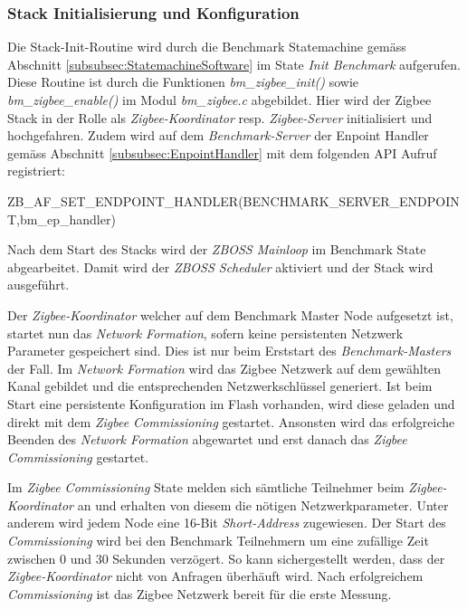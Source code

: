 \subsubsection{Stack Initialisierung und Konfiguration}\label{subsubsec:ZigbeeStackInitundKonfiguration}
Die Stack-Init-Routine wird durch die Benchmark Statemachine gemäss Abschnitt \ref{subsubsec:StatemachineSoftware} im State \textit{Init Benchmark} aufgerufen.
Diese Routine ist durch die Funktionen \textit{bm\_zigbee\_init()} sowie \textit{bm\_zigbee\_enable()} im Modul \textit{bm\_zigbee.c} abgebildet.
Hier wird der Zigbee Stack in der Rolle als \textit{Zigbee-Koordinator} resp. \textit{Zigbee-Server} initialisiert und hochgefahren.
Zudem wird auf dem \textit{Benchmark-Server} der Enpoint Handler gemäss Abschnitt \ref{subsubsec:EnpointHandler} mit dem folgenden API Aufruf registriert:

ZB\_AF\_SET\_ENDPOINT\_HANDLER(BENCHMARK\_SERVER\_ENDPOINT,\linebreak bm\_ep\_handler)

Nach dem Start des Stacks wird der \textit{ZBOSS Mainloop} im Benchmark State abgearbeitet. Damit wird der \textit{ZBOSS Scheduler} aktiviert und der Stack wird ausgeführt.

Der \textit{Zigbee-Koordinator} welcher auf dem Benchmark Master Node aufgesetzt ist, startet nun das \textit{Network Formation}, sofern keine persistenten Netzwerk Parameter gespeichert sind.
Dies ist nur beim Erststart des \textit{Benchmark-Masters} der Fall.
Im \textit{Network Formation} wird das Zigbee Netzwerk auf dem gewählten Kanal gebildet und die entsprechenden Netzwerkschlüssel generiert.
Ist beim Start eine persistente Konfiguration im Flash vorhanden, wird diese geladen und direkt mit dem \textit{Zigbee Commissioning} gestartet.
Ansonsten wird das erfolgreiche Beenden des \textit{Network Formation} abgewartet und erst danach das \textit{Zigbee Commissioning} gestartet.

Im \textit{Zigbee Commissioning} State melden sich sämtliche Teilnehmer beim \textit{Zigbee-Koordinator} an und erhalten von diesem die nötigen Netzwerkparameter.
Unter anderem wird jedem Node eine 16-Bit \textit{Short-Address} zugewiesen.
Der Start des \textit{Commissioning} wird bei den Benchmark Teilnehmern um eine zufällige Zeit zwischen 0 und 30 Sekunden verzögert.
So kann sichergestellt werden, dass der \textit{Zigbee-Koordinator} nicht von Anfragen überhäuft wird.
Nach erfolgreichem \textit{Commissioning} ist das Zigbee Netzwerk bereit für die erste Messung.


